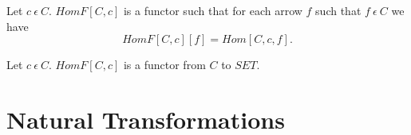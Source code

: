 \documentclass{article}
\newcommand{\inn}{~\epsilon~}
\newcommand{\innn}{~\epsilon~} %
\begin{document}
\begin{forthel}
		
		\begin{definition} 
			Let $c \innn C$.
			$HomF[C,c]$ is a functor such that 
			for each arrow $f$ such that $f \inn C$ we have $$HomF[C,c][f] = Hom[C,c,f].$$
		\end{definition}
		
		
		
		\begin{axiom} 
			Let $c \innn C$. 
			$HomF[C,c]$ is a functor from $C$ to $SET$.
		\end{axiom}




		
	\end{forthel}
	

	\section{Natural Transformations}
	
\end{document}
